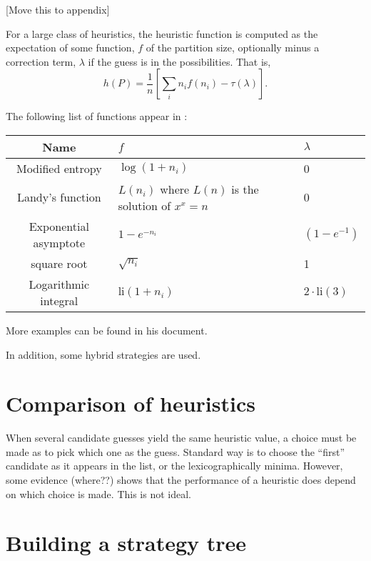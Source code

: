 [Move this to appendix]

For a large class of heuristics, the heuristic function is computed as the expectation of some function, $f$ of the partition size, optionally minus a correction term, $\lambda$ if the guess is in the possibilities. That is,
\[
h(P) = \frac{1}{n} \left[\sum_i n_i f(n_i) - \tau(\lambda) \right].
\]

The following list of functions appear in \cite{pepperdine10}:
\begin{center}
\begin{tabular}{c l l}
\hline
Name & $f$ & $\lambda$ \\
\hline
Modified entropy & $\log (1+n_i)$ & 0 \\
Landy's function & $L(n_i)$ where $L(n)$ is the solution of $x^x = n$ & 0 \\
Exponential asymptote & $1-e^{-n_i}$ & $(1-e^{-1})$ \\
square root & $\sqrt{n_i}$ & 1 \\
Logarithmic integral & $\text{li}(1+n_i)$ & $2 \cdot \text{li}(3)$ \\
\hline
\end{tabular}
\end{center}
More examples can be found in his document.

In addition, some hybrid strategies are used.

\section{Comparison of heuristics}

When several candidate guesses yield the same heuristic value, a choice must be made as to pick which one as the guess. Standard way is to choose the ``first'' candidate as it appears in the list, or the lexicographically minima. However, some evidence (where??) shows that the performance of a heuristic does depend on which choice is made. This is not ideal.

\section{Building a strategy tree}
























